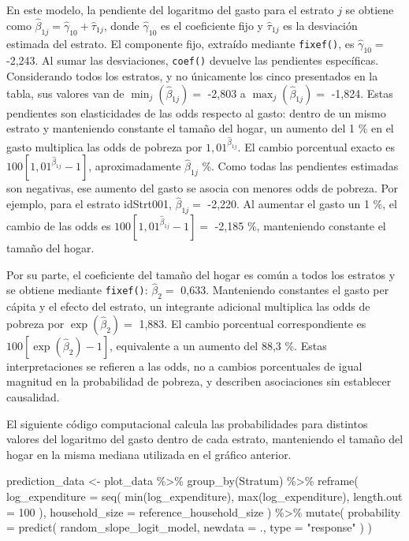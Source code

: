 \documentclass[
  spanish,
  11pt,
  letterpaper,
  oneside,
  open=any]{scrbook}
\newenvironment{Shaded}{\begin{snugshade}}{\end{snugshade}}
\newcommand{\AttributeTok}[1]{\textcolor[rgb]{0.40,0.45,0.13}{#1}}
\newcommand{\DecValTok}[1]{\textcolor[rgb]{0.68,0.00,0.00}{#1}}
\newcommand{\FunctionTok}[1]{\textcolor[rgb]{0.28,0.35,0.67}{#1}}
\newcommand{\NormalTok}[1]{\textcolor[rgb]{0.00,0.23,0.31}{#1}}
\newcommand{\OtherTok}[1]{\textcolor[rgb]{0.00,0.23,0.31}{#1}}
\newcommand{\SpecialCharTok}[1]{\textcolor[rgb]{0.37,0.37,0.37}{#1}}
\newcommand{\StringTok}[1]{\textcolor[rgb]{0.13,0.47,0.30}{#1}}
\begin{document}
En este modelo, la pendiente del logaritmo del gasto para el estrato
\(j\) se obtiene como
\(\hat{\beta}_{1j}=\hat{\gamma}_{10}+\hat{\tau}_{1j}\), donde
\(\hat{\gamma}_{10}\) es el coeficiente fijo y \(\hat{\tau}_{1j}\) es la
desviación estimada del estrato. El componente fijo, extraído mediante
\texttt{fixef()}, es \(\hat{\gamma}_{10}=\) -2,243. Al sumar las
desviaciones, \texttt{coef()} devuelve las pendientes específicas.
Considerando todos los estratos, y no únicamente los cinco presentados
en la tabla, sus valores van de \(\min_j(\hat{\beta}_{1j})=\) -2,803 a
\(\max_j(\hat{\beta}_{1j})=\) -1,824. Estas pendientes son elasticidades
de las odds respecto al gasto: dentro de un mismo estrato y manteniendo
constante el tamaño del hogar, un aumento del 1 \% en el gasto
multiplica las odds de pobreza por \(1{,}01^{\hat{\beta}_{1j}}\). El
cambio porcentual exacto es \(100[1{,}01^{\hat{\beta}_{1j}}-1]\),
aproximadamente \(\hat{\beta}_{1j}\) \%. Como todas las pendientes
estimadas son negativas, ese aumento del gasto se asocia con menores
odds de pobreza. Por ejemplo, para el estrato idStrt001,
\(\hat\beta_{1j}=\) -2,220. Al aumentar el gasto un 1 \%, el cambio de
las odds es \(100[1{,}01^{\hat\beta_{1j}}-1]=\) -2,185 \%, manteniendo
constante el tamaño del hogar.

Por su parte, el coeficiente del tamaño del hogar es común a todos los
estratos y se obtiene mediante \texttt{fixef()}: \(\hat{\beta}_{2}=\)
0,633. Manteniendo constantes el gasto per cápita y el efecto del
estrato, un integrante adicional multiplica las odds de pobreza por
\(\exp(\hat{\beta}_{2})=\) 1,883. El cambio porcentual correspondiente
es \(100[\exp(\hat{\beta}_{2})-1]\), equivalente a un aumento del 88,3
\%. Estas interpretaciones se refieren a las odds, no a cambios
porcentuales de igual magnitud en la probabilidad de pobreza, y
describen asociaciones sin establecer causalidad.

El siguiente código computacional calcula las probabilidades para
distintos valores del logaritmo del gasto dentro de cada estrato,
manteniendo el tamaño del hogar en la misma mediana utilizada en el
gráfico anterior.

\begin{Shaded}
\begin{Highlighting}[]
\NormalTok{prediction\_data }\OtherTok{\textless{}{-}}\NormalTok{ plot\_data }\SpecialCharTok{\%\textgreater{}\%}
  \FunctionTok{group\_by}\NormalTok{(Stratum) }\SpecialCharTok{\%\textgreater{}\%}
  \FunctionTok{reframe}\NormalTok{(}
    \AttributeTok{log\_expenditure =} \FunctionTok{seq}\NormalTok{(}
      \FunctionTok{min}\NormalTok{(log\_expenditure),}
      \FunctionTok{max}\NormalTok{(log\_expenditure),}
      \AttributeTok{length.out =} \DecValTok{100}
\NormalTok{    ),}
    \AttributeTok{household\_size =}\NormalTok{ reference\_household\_size}
\NormalTok{  ) }\SpecialCharTok{\%\textgreater{}\%}
  \FunctionTok{mutate}\NormalTok{(}
    \AttributeTok{probability =} \FunctionTok{predict}\NormalTok{(}
\NormalTok{      random\_slope\_logit\_model,}
      \AttributeTok{newdata =}\NormalTok{ .,}
      \AttributeTok{type =} \StringTok{"response"}
\NormalTok{    )}
\NormalTok{  )}
\end{Highlighting}
\end{Shaded}
\end{document}
